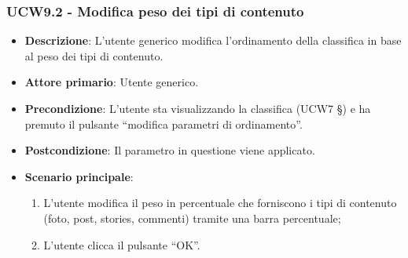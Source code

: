 \subsubsection{UCW9.2 - Modifica peso dei tipi di contenuto}
\begin{itemize}
	\item \textbf{Descrizione}: L'utente generico modifica l'ordinamento della classifica in base al peso dei tipi di contenuto.
    \item \textbf{Attore primario}: Utente generico.
    \item \textbf{Precondizione}: L’utente sta visualizzando la classifica (UCW7 §) e ha premuto il pulsante “modifica parametri di ordinamento”.
    \item \textbf{Postcondizione}: Il parametro in questione viene applicato.
    \item \textbf{Scenario principale}: 
    \begin{enumerate}
        \item L’utente modifica il peso in percentuale che forniscono i tipi di contenuto (foto, post, stories, commenti) tramite una barra percentuale;
        \item L’utente clicca il pulsante “OK”.
    \end{enumerate}
\end{itemize}

\pagebreak